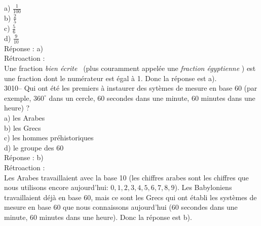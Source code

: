 \documentclass[letterpaper, 12pt]{article}
\begin{document}
a) $\frac{1}{100}$\\[2mm]
b) $\frac{2}{5}$\\[2mm]
c) $\frac{5}{6}$\\[2mm]
d) $\frac{9}{10}$\\[2mm]

R\'eponse : a)\\

R\'etroaction :\\
Une fraction \og \emph{bien \'ecrite} \fg \ (plus couramment appel\'ee une \og \emph{fraction \'egyptienne} \fg) est une fraction dont le num\'erateur est \'egal \`a 1. Donc la r\'eponse est a).\\



3010-- Qui ont \'et\'e les premiers \`a instaurer des syt\`emes de mesure en base 60 (par exemple, $360^{\circ}$ dans un cercle, $60$ secondes dans une minute, $60$ minutes dans une heure) ?\\

a) les Arabes\\
b) les Grecs\\
c) les hommes pr\'ehistoriques\\
d) le groupe des 60\\

R\'eponse : b)\\

R\'etroaction :\\
Les Arabes travaillaient avec la base 10 (les chiffres arabes sont les chiffres que nous utilisons encore aujourd'hui: \og$0, 1, 2, 3, 4, 5, 6, 7, 8, 9$\fg). Les Babyloniens travaillaient d\'ej\`a en base 60, mais ce sont les Grecs qui ont \'etabli les syst\`emes de mesure en base 60 que nous connaissons aujourd'hui (60 secondes dans une minute, 60 minutes dans une heure). Donc la r\'eponse est b).\\
\end{document}
